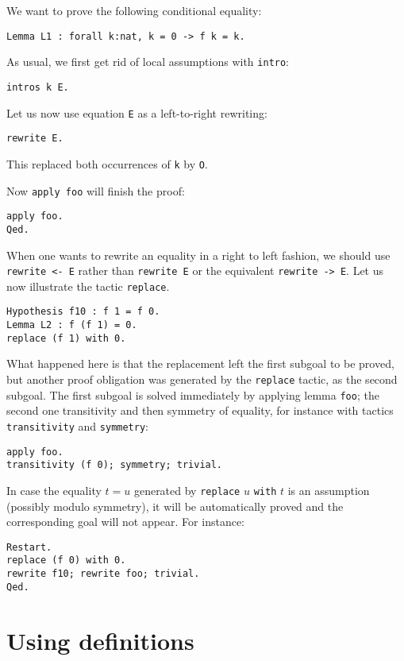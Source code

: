 \documentclass{book}
\begin{document}
We want to prove the following conditional equality:
\begin{lstlisting}
Lemma L1 : forall k:nat, k = 0 -> f k = k.
\end{lstlisting}

As usual, we first get rid of local assumptions with \verb:intro::
\begin{lstlisting}
intros k E.
\end{lstlisting}

Let us now use equation \verb:E: as a left-to-right rewriting:
\begin{lstlisting}
rewrite E.
\end{lstlisting}
This replaced both occurrences of \verb:k: by \verb:O:. 

Now \verb:apply foo: will finish the proof:

\begin{lstlisting}
apply foo.
Qed.
\end{lstlisting}

When one wants to rewrite an equality in a right to left fashion, we should
use \verb:rewrite <- E: rather than \verb:rewrite E: or the equivalent
\verb:rewrite -> E:. 
Let us now illustrate the tactic \verb:replace:.
\begin{lstlisting}
Hypothesis f10 : f 1 = f 0.
Lemma L2 : f (f 1) = 0.
replace (f 1) with 0.
\end{lstlisting}
What happened here is that the replacement left the first subgoal to be
proved, but another proof obligation was generated by the \verb:replace:
tactic, as the second subgoal. The first subgoal is solved immediately
by applying lemma \verb:foo:; the second one transitivity and then 
symmetry of equality, for instance with tactics \verb:transitivity: and 
\verb:symmetry::
\begin{lstlisting}
apply foo.
transitivity (f 0); symmetry; trivial.
\end{lstlisting}
In case the equality $t=u$ generated by \verb:replace: $u$ \verb:with:
$t$ is an assumption
(possibly modulo symmetry), it will be automatically proved and the
corresponding goal will not appear. For instance:
\begin{lstlisting}
Restart.
replace (f 0) with 0.
rewrite f10; rewrite foo; trivial.
Qed.
\end{lstlisting}

\section{Using definitions}
\end{document}

